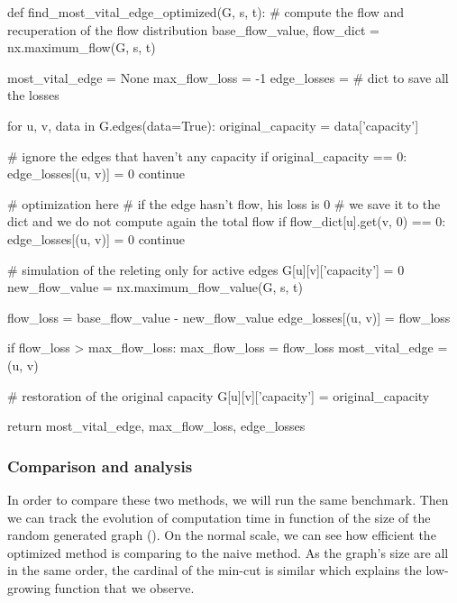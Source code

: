 \documentclass[12pt, openany]{article}
\begin{document}
\begin{python}[caption={Python code for the optimized approach in order to identify the most vital edge},  label={lst:2_optimized_method_lst}]
def find_most_vital_edge_optimized(G, s, t):
    # compute the flow and recuperation of the flow distribution
    base_flow_value, flow_dict = nx.maximum_flow(G, s, t)
    
    most_vital_edge = None
    max_flow_loss = -1
    edge_losses = {} # dict to save all the losses
    
    for u, v, data in G.edges(data=True):
        original_capacity = data['capacity']
        
        # ignore the edges that haven't any capacity
        if original_capacity == 0: 
            edge_losses[(u, v)] = 0
            continue
            
        # optimization here
        # if the edge hasn't flow, his loss is 0
        # we save it to the dict and we do not compute again the total flow
        if flow_dict[u].get(v, 0) == 0:
            edge_losses[(u, v)] = 0
            continue
            
        # simulation of the releting only for active edges
        G[u][v]['capacity'] = 0
        new_flow_value = nx.maximum_flow_value(G, s, t)
        
        flow_loss = base_flow_value - new_flow_value
        edge_losses[(u, v)] = flow_loss
        
        if flow_loss > max_flow_loss:
            max_flow_loss = flow_loss
            most_vital_edge = (u, v)
            
        # restoration of the original capacity
        G[u][v]['capacity'] = original_capacity
        
    return most_vital_edge, max_flow_loss, edge_losses
\end{python}

\subsubsection{Comparison and analysis}

In order to compare these two methods, we will run the same benchmark.
Then we can track the evolution of computation time in function of the size of the random generated graph (). On the normal scale, we can see how efficient the optimized method is comparing to the naive method. As the graph's size are all in the same order, the cardinal of the min-cut is similar which explains the low-growing function that we observe.
\end{document}

